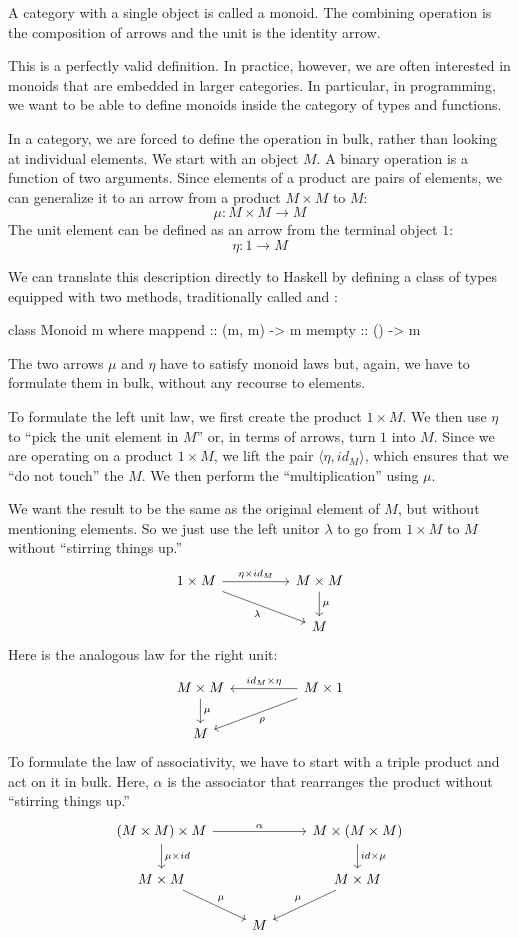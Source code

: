 \documentclass[DaoFP]{subfiles}
\begin{document}
A category with a single object is called a monoid. The combining operation is the composition of arrows and the unit is the identity arrow. 

This is a perfectly valid definition. In practice, however, we are often interested in monoids that are embedded in larger categories. In particular, in programming, we want to be able to define monoids inside the category of types and functions. 

In a category, we are forced to define the operation in bulk, rather than looking at individual elements. We start with an object $M$. A binary operation is a function of two arguments. Since elements of a product are pairs of elements, we can generalize it to an arrow from a product $M \times M$ to $M$:
\[ \mu \colon M \times M \to M \]
The unit element can be defined as an arrow from the terminal object $1$:
\[ \eta \colon 1 \to M \]

We can translate this description directly to Haskell by defining a class of types equipped with two methods, traditionally called  and :
\begin{haskell}
class Monoid m where
  mappend :: (m, m) -> m
  mempty  :: () -> m
\end{haskell}

The two arrows $\mu$ and $\eta$ have to satisfy monoid laws but, again, we have to formulate them in bulk, without any recourse to elements.

To formulate the left unit law, we first create the product $1 \times M$. We then use $\eta$ to ``pick the unit element in $M$'' or, in terms of arrows, turn $1$ into $M$. Since we are operating on a product $1 \times M$, we  lift the pair $\langle \eta, id_M \rangle$, which ensures that we ``do not touch'' the $M$. We then perform the ``multiplication'' using $\mu$. 

We want the result to be the same as the original element of $M$, but without mentioning elements. So we just use the left unitor $\lambda$ to go from $1 \times M$ to $M$ without ``stirring things up.''
\[
 \begin{tikzcd}
 1 \times M
 \arrow[rr, "\eta \times id_M"]
 \arrow[rrd, "\lambda"']
& & M \times M
 \arrow[d, "\mu"]
 \\
 && M
  \end{tikzcd}
\]
Here is the analogous law for the right unit:
\[
 \begin{tikzcd}
 M \times M
 \arrow[d, "\mu"]
 && M \times 1
 \arrow[ll, "id_M \times \eta"']
 \arrow[lld, "\rho"]
 \\
 M
 \end{tikzcd}
\]
To formulate the law of associativity, we have to start with a triple product and act on it in bulk. Here, $\alpha$ is the associator that rearranges the product without ``stirring things up.''
\[
 \begin{tikzcd}
 (M \times M) \times M 
 \arrow[rr, "\alpha"]
 \arrow[d, "\mu \times id"]
 &&
 M \times (M \times M)
 \arrow[d, "id \times \mu"]
 \\
 M \times M 
 \arrow[dr, "\mu"]
& & M \times M
 \arrow[dl, "\mu"']
 \\
&  M
 \end{tikzcd}
\]
\end{document}
